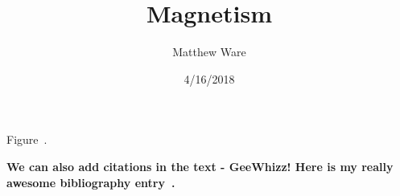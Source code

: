 \documentclass[12pt]{article}
\begin{document}
\title{Magnetism}
\author{Matthew Ware}
\date{4/16/2018}
\maketitle

Figure~.

\lipsum[1-3]

\textbf{We can also add citations in the text - GeeWhizz!
Here is my really awesome bibliography entry~\cite{SampleBibEntry}.} 

\lipsum[4-6]

\printAllEquations



\end{document}
